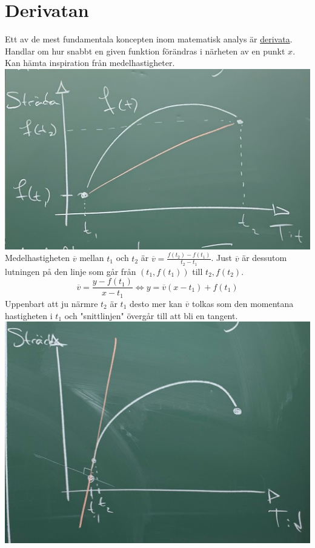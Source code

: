 \chapter{Derivatan}
Ett av de mest fundamentala koncepten inom matematisk analys är \underline{derivata}.
Handlar om hur snabbt en given funktion förändras i närheten av en punkt $x$.
Kan hämta inspiration från medelhastigheter.\\
\includegraphics[scale=0.2]{lessons/lesson06/imgs/img01.jpg}\\
Medelhastigheten $\overline{v}$ mellan $t_1$ och $t_2$ är $\overline{v}=\frac{f(t_2)-f(t_1)}{t_2-t_1}$.
Just $\overline{v}$ är dessutom lutningen på den linje som går från $(t_1,f(t_1))$ till $t_2,f(t_2)$.
\begin{equation*}
    \overline{v}=\frac{y-f(t_1)}{x-t_1}\Leftrightarrow y=\overline{v}(x-t_1)+f(t_1)
\end{equation*}
Uppenbart att ju närmre $t_2$ är $t_1$ desto mer kan $\overline{v}$ tolkas som den momentana hastigheten i $t_1$
och "snittlinjen" övergår till att bli en tangent.\\
\includegraphics[scale=0.2]{lessons/lesson06/imgs/img02.jpg}\\
